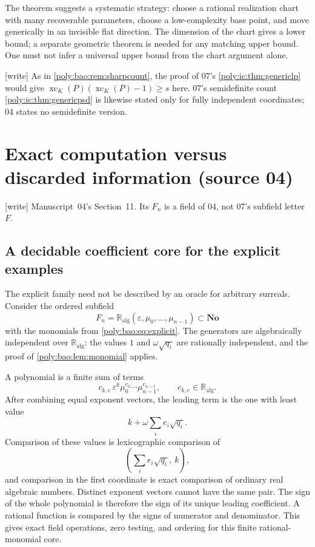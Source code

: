 \documentclass[11pt,a4paper]{article}
\numberwithin{equation}{section}
\theoremstyle{plain}
\newcommand{\wtag}{\textup{[write]}}%
\newcommand{\No}{\mathbf{No}}
\newcommand{\eps}{\varepsilon}
\newcommand{\A}{\mathbb R_{\mathrm{alg}}}
\newcommand{\xc}{\operatorname{xc}}
\begin{document}
The theorem suggests a systematic strategy: choose a rational realization
chart with many recoverable parameters, choose a low-complexity base point,
and move generically in an invisible flat direction. The dimension of
the chart gives a lower bound; a separate geometric theorem is needed
for any matching upper bound. One must not infer a universal upper bound
from the chart argument alone.

\wtag{} As in \cref{poly:bao:rem:sharpcount}, the proof of 07's
\cref{poly:ic:thm:genericlp} would give $\xc_K(P)(\xc_K(P)-1)\geq s$ here.
07's semidefinite count \cref{poly:ic:thm:genericpsd} is likewise stated only
for fully independent coordinates; 04 states no semidefinite version.

\section{Exact computation versus discarded information (source 04)}\label{poly:bao:sec:computation}

\wtag{} Manuscript~04's Section~11. Its $F_n$ is a field of 04, not 07's
subfield letter $F$.

\subsection{A decidable coefficient core for the explicit examples}
The explicit family need not be described by an oracle for arbitrary
surreals. Consider the ordered subfield
\[
 F_n=\A(\eps,\mu_0,\ldots,\mu_{n-1})\subset\No
\]
with the monomials from \eqref{poly:bao:eq:explicit}. The generators are
algebraically independent over $\A$: the values $1$ and
$\omega\sqrt{q_i}$ are rationally independent, and the proof of
\cref{poly:bao:lem:monomial} applies.

A polynomial is a finite sum of terms
\[
 c_{k,e}\,\eps^k\mu_0^{e_0}\cdots\mu_{n-1}^{e_{n-1}},
 \qquad c_{k,e}\in\A.
\]
After combining equal exponent vectors, the leading term is the one with
least value
\[
 k+\omega\sum_i e_i\sqrt{q_i}.
\]
Comparison of these values is lexicographic comparison of
\begin{equation}\label{poly:bao:eq:weightpair}
 \left(\sum_i e_i\sqrt{q_i},\ k\right),
\end{equation}
and comparison in the first coordinate is exact comparison of ordinary
real algebraic numbers. Distinct exponent vectors cannot have the same
pair. The sign of the whole polynomial is therefore the sign of its
unique leading coefficient. A rational function is compared by the
signs of numerator and denominator. This gives exact field operations,
zero testing, and ordering for this finite rational-monomial core.
\end{document}
